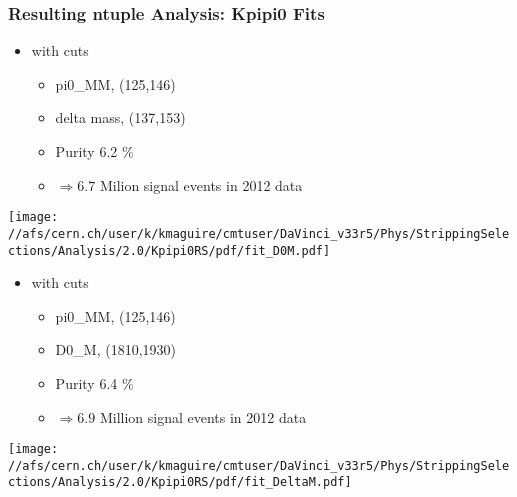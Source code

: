 \documentclass[10pt,a4paper]{beamer}
\begin{document}
\begin{frame}
\frametitle{Resulting ntuple Analysis: Kpipi0 Fits}
\begin{minipage}{5.25cm}
\begin{itemize}
\item{with cuts}
\begin{itemize}
\item{pi0\_MM, (125,146)}  
\item{delta mass, (137,153)}
\item{Purity 6.2 \%}
\item{$\Rightarrow 6.7$ Milion signal events in 2012 data}
\end{itemize}
\end{itemize}
\texttt{[image: //afs/cern.ch/user/k/kmaguire/cmtuser/DaVinci\_v33r5/Phys/StrippingSelections/Analysis/2.0/Kpipi0RS/pdf/fit\_D0M.pdf]}
\end{minipage}
\hspace{2.0em}
\begin{minipage}{5.25cm}
\begin{itemize}
\item{with cuts}
\begin{itemize}
\item{pi0\_MM, (125,146)}  
\item{D0\_M, (1810,1930)}
\item{Purity 6.4 \%}
\item{$\Rightarrow 6.9$ Million signal events in 2012 data}
\end{itemize}
\end{itemize}
\texttt{[image: //afs/cern.ch/user/k/kmaguire/cmtuser/DaVinci\_v33r5/Phys/StrippingSelections/Analysis/2.0/Kpipi0RS/pdf/fit\_DeltaM.pdf]}
\end{minipage}
\end{frame}
\end{document}
